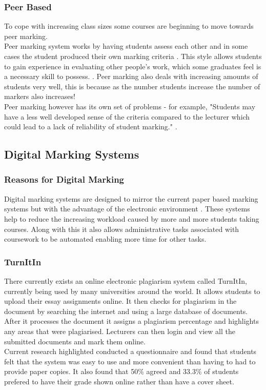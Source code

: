 \documentclass[12pt]{article}  %
\begin{document}
\subsubsection{Peer Based}
To cope with increasing class sizes some courses are beginning to move towards peer marking.\\
Peer marking system works by having students assess each other and in some cases  the student produced their own marking criteria \cite{orsmond_use_2000}. This style allows  students to gain experience in evaluating other people's work, which some graduates feel is a necessary skill to possess. \cite{langan_insights_????}. Peer marking also deals with increasing amounts of students very well, this is because as the number students increase the number of markers also increases!  \\
Peer marking however has its own set of problems - for example, "Students may have a less well developed sense of the criteria compared to the lecturer which could lead to a lack of reliability of student marking." \cite{orsmond_use_2000}. 


\newpage
\subsection{Digital Marking Systems}

\subsubsection{Reasons for Digital Marking}
Digital marking systems are designed to mirror the current paper based marking systems but with the advantage of the electronic environment \cite{heinrich_online_2003}. These systems help to reduce the increasing workload caused by more and more students taking courses. Along with this it also allows administrative tasks associated with coursework to be automated enabling more time for other tasks.\cite{joy_effective_1998} 

\subsubsection{TurnItIn}
There currently exists an online electronic plagiarism system called TurnItIn, \cite{_turnitin_????} currently being used by many universities around the world. It allows students to upload their essay assignments online. It then checks for plagiarism in the document by searching the internet and using a large database of documents. After it processes the document it assigns a plagiarism percentage and highlights any areas that were plagiarised. Lecturers can then login and view all the submitted documents and mark them online.\\
Current research highlighted \cite{dahl_turnitin_2007} conducted a questionnaire and found that students felt that the system was easy to use and more convenient than having to had to provide paper copies. It also found that 50\% agreed and 33.3\% of students prefered to have their grade shown online rather than have a cover sheet.
\end{document}
